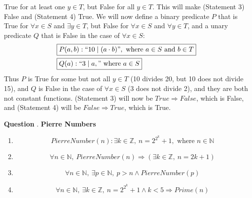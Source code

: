 \documentclass{article}
\newcounter{qcount}
\newcommand\q{\stepcounter{qcount} \textbf{Question \theqcount}. }
\begin{document}
\begin{enumerate}[label=(\alph*)]
    True for at least one $y \in T$, but False for all $y \in T$. This will make (Statement 3)
    False and (Statement 4) True. We will now define a binary predicate $P$ 
    that is True for $\forall x \in S$ and $\exists y \in T$, but False for 
    $\forall x \in S$ and $\forall y \in T$, and a unary predicate $Q$ that is False 
    in the case of $\forall x \in S$:
    \begin{align*}
        &\boxed{P(a, b) : ``10 \mid (a \cdot b)", \text{ where } a \in S \text{ and } b \in T}\\
        &\boxed{Q(a) : ``3 \mid a," \text{ where } a \in S}
    \end{align*} 
    Thus $P$ is True for some but not all $y \in T$ (10 divides 20, but 10 
    does not divide 15), and $Q$ is False in the case of $\forall x \in S$ 
    (3 does not divide 2), and they are both not constant functions. (Statement 3)
    will now be $True \Rightarrow False$, which is False, and (Statement 4) 
    will be $False \Rightarrow True$, which is True. 
\end{enumerate}

\newpage
\q \textbf{Pierre Numbers}
\begin{enumerate} [label= (\alph*)]
    \item 
        $$PierreNumber(n) : \exists k \in \mathbb{Z}, \: n = 2^{2^k} + 1, 
        \text{ where } n \in \mathbb{N}$$
    \item $$\forall n \in \mathbb{N}, \: PierreNumber(n) \Rightarrow 
        (\exists k \in \mathbb{Z}, \: n = 2k + 1)$$
    \item $$\forall n \in \mathbb{N}, \: \exists p \in \mathbb{N},
        \: p > n \land PierreNumber (p)$$
    \item $$\forall n \in \mathbb{N}, \: \exists k \in \mathbb{Z}, \: n = 
        2^{2^k} + 1 \land k < 5 \Rightarrow Prime(n)$$
\end{enumerate}
\end{document}
